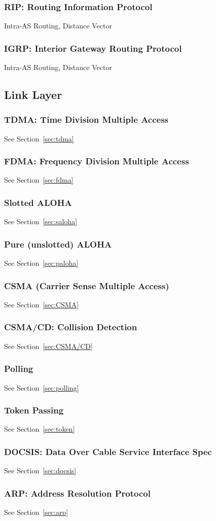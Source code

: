 \subsubsection{RIP: Routing Information Protocol}
Intra-AS Routing, Distance Vector
\subsubsection{IGRP: Interior Gateway Routing Protocol}
Intra-AS Routing, Distance Vector

\subsection{Link Layer}
\subsubsection{TDMA: Time Division Multiple Access}
See Section~\ref{sec:tdma}
\subsubsection{FDMA: Frequency Division Multiple Access}
See Section~\ref{sec:fdma}
\subsubsection{Slotted ALOHA}
See Section~\ref{sec:saloha}
\subsubsection{Pure (unslotted) ALOHA}
See Section~\ref{sec:paloha}
\subsubsection{CSMA (Carrier Sense Multiple Access)}
See Section~\ref{sec:CSMA}
\subsubsection{CSMA/CD: Collision Detection}
See Section~\ref{sec:CSMA/CD}
\subsubsection{Polling}
See Section~\ref{sec:polling}
\subsubsection{Token Passing}
See Section~\ref{sec:token}
\subsubsection{DOCSIS: Data Over Cable Service Interface Spec}
See Section~\ref{sec:docsis}
\subsubsection{ARP: Address Resolution Protocol}
See Section~\ref{sec:arp}
